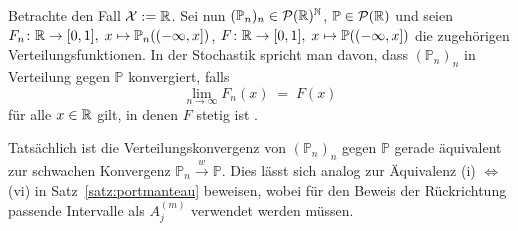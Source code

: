 \documentclass[../main/main.tex]{subfiles}
\begin{document}
	\begin{Bemerkung}[Verteilungskonvergenz]
		Betrachte den Fall $\mathcal{X} := \mathbb{R}$. Sei nun $(\mathbb{P}_n)_n \in \mathcal{P}(\mathbb{R})^{\mathbb{N}}$,  $\mathbb{P} \in \mathcal{P}(\mathbb{R})$ und seien $F_n \colon \mathbb{R} \to [0, 1], \; x \mapsto \mathbb{P}_n((-\infty, x]) $, $F \colon \mathbb{R} \to [0, 1], \; x \mapsto \mathbb{P}((-\infty, x]) $ die zugehörigen Verteilungsfunktionen. In der Stochastik spricht man davon, dass $(\mathbb{P}_n)_n$ in Verteilung gegen $\mathbb{P}$ konvergiert, falls 
		\[ \lim_{n \to \infty} F_n(x) \; = \; F(x) \]
		für alle $x \in \mathbb{R}$ gilt, in denen $F$ stetig ist \cite[Definition 6.1]{Henze.2016}. 
		
		Tatsächlich ist die Verteilungskonvergenz von $(\mathbb{P}_n)_n$ gegen $\mathbb{P}$ gerade äquivalent zur schwachen Konvergenz $\mathbb{P}_n \xrightarrow{w} \mathbb{P}$. Dies lässt sich analog zur Äquivalenz (i) $\Leftrightarrow$ (vi) in Satz~\ref{satz:portmanteau} beweisen, wobei für den Beweis der Rückrichtung passende Intervalle als $A_j^{(m)}$ verwendet werden müssen.
	\end{Bemerkung}
	
\end{document}
